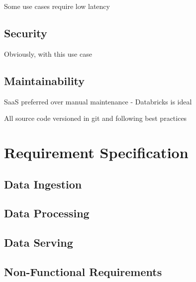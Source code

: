 Some use cases require low latency

\subsection{Security}

Obviously, with this use case

\subsection{Maintainability}

SaaS preferred over manual maintenance - Databricks is ideal

All source code versioned in git and following best practices




\section{Requirement Specification}

\subsection{Data Ingestion}

\subsection{Data Processing}

\subsection{Data Serving}

\subsection{Non-Functional Requirements}
